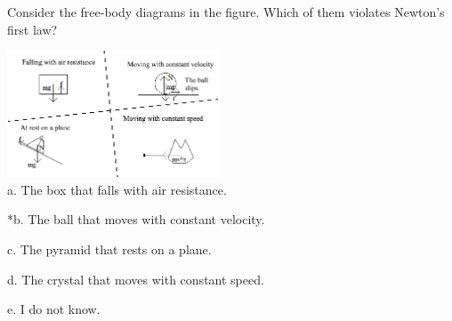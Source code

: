 
Consider the free-body diagrams in the figure. Which of them violates Newton's first law?

\includegraphics[width=2.5in]{../../Images/NewtonsLawsQ2.png} \\

a. The box that falls with air resistance.

*b. The ball that moves with constant velocity.

c. The pyramid that rests on a plane.

d. The crystal that moves with constant speed.

e. I do not know. \\
